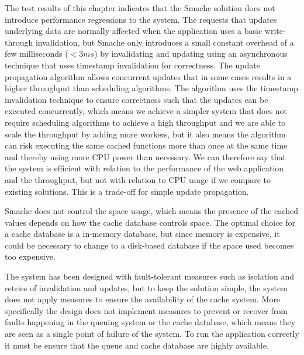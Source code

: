 The test results of this chapter indicates that the Smache solution does not introduce performance regressions to the system. The requests that updates underlying data are normally affected when the application uses a basic write-through invalidation, but Smache only introduces a small constant overhead of a few milliseconds ($< 3 ms$) by invalidating and updating using an asynchronous technique that uses timestamp invalidation for correctness. The update propagation algorithm allows concurrent updates that in some cases results in a higher throughput than scheduling algorithms. The algorithm uses the timestamp invalidation technique to ensure correctness such that the updates can be executed concurrently, which means we achieve a simpler system that does not require scheduling algorithms to achieve a high throughput and we are able to scale the throughput by adding more workers, but it also means the algorithm can risk executing the same cached functions more than once at the same time and thereby using more CPU power than necessary. We can therefore say that the system is efficient with relation to the performance of the web application and the throughput, but not with relation to CPU usage if we compare to existing solutions. This is a trade-off for simple update propagation.

Smache does not control the space usage, which means the presence of the cached values depends on how the cache database controls space. The optimal choice for a cache database is a in-memory database, but since memory is expensive, it could be necessary to change to a disk-based database if the space used becomes too expensive.

The system has been designed with fault-tolerant measures such as isolation and retries of invalidation and updates, but to keep the solution simple, the system does not apply measures to ensure the availability of the cache system. More specifically the design does not implement measures to prevent or recover from faults happening in the queuing system or the cache database, which means they are seen as a single point of failure of the system. To run the application correctly it must be ensure that the queue and cache database are highly available.


